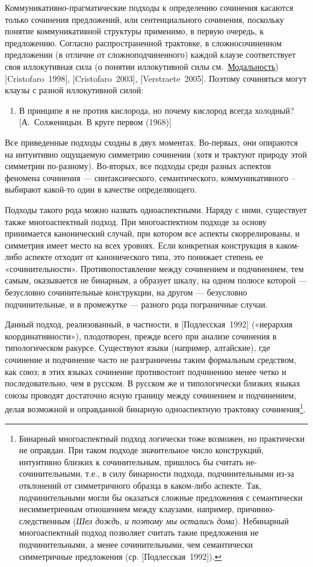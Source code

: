 Коммуникативно-прагматические подходы к определению сочинения касаются
только сочинения предложений, или сентенциального сочинения, поскольку
понятие коммуникативной структуры применимо, в первую очередь, к
предложению. Согласно распространенной трактовке, в сложносочиненном
предложении (в отличие от сложноподчиненного) каждой клаузе
соответствует своя иллокутивная сила (о понятии иллокутивной силы
см.~\underline{Модальность}) {[}Cristofaro~1998{]},
{[}Cristofaro~2003{]}, {[}Verstraete~2005{]}. Поэтому сочиняться могут
клаузы с разной иллокутивной силой:

\begin{enumerate}
\def\labelenumi{(\arabic{enumi})}
\item
  В принципе я не против кислорода, но почему кислород всегда холодный?
  {[}А.~Солженицын. В круге первом (1968){]}
\end{enumerate}

Все приведенные подходы сходны в двух моментах. Во-первых, они опираются
на интуитивно ощущаемую симметрию сочинения (хотя и трактуют природу
этой симметрии по-разному). Во-вторых, все подходы среди разных аспектов
феномена сочинения --- синтаксического, семантического, коммуникативного
-- выбирают какой-то один в качестве определяющего.

Подходы такого рода можно назвать одноаспектными. Наряду с ними,
существует также многоаспектный подход. При многоаспектном подходе за
основу принимается канонический случай, при котором все аспекты
скоррелированы, и симметрия имеет место на всех уровнях. Если конкретная
конструкция в каком-либо аспекте отходит от канонического типа, это
понижает степень ее «сочинительности». Противопоставление между
сочинением и подчинением, тем самым, оказывается не бинарным, а образует
шкалу, на одном полюсе которой --- безусловно сочинительные конструкции,
на другом --- безусловно подчинительные, и в промежутке --- разного рода
пограничные случаи.

Данный подход, реализованный, в частности, в {[}Подлесская~1992{]}
(«иерархия координативности»), плодотворен, прежде всего при анализе
сочинения в типологическом ракурсе. Существуют языки (например,
алтайские), где сочинение и подчинение часто не разграничены таким
формальным средством, как союз; в этих языках сочинение противостоит
подчинению менее четко и последовательно, чем в русском. В русском же и
типологически близких языках союзы проводят достаточно ясную границу
между сочинением и подчинением, делая возможной и оправданной бинарную
одноаспектную трактовку сочинения\footnote{Бинарный многоаспектный
  подход логически тоже возможен, но практически не оправдан. При таком
  подходе значительное число конструкций, интуитивно близких к
  сочинительным, пришлось бы считать не-сочинительными, т.е., в силу
  бинарности подхода, подчинительными из-за отклонений от симметричного
  образца в каком-либо аспекте. Так, подчинительными могли бы оказаться
  сложные предложения с семантически несимметричным отношением между
  клаузами, например, причинно-следственным (\textit{Шел дождь}, \textit{и
  поэтому мы остались дома}). Небинарный многоаспектный подход позволяет
  считать такие предложения не подчинительными, а менее сочинительными,
  чем семантически симметричные предложения (ср. {[}Подлесская~1992{]}).}.

